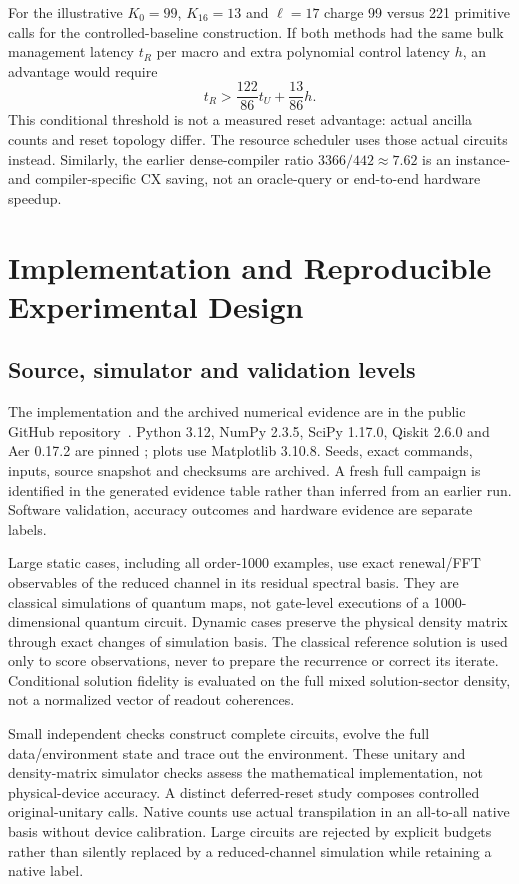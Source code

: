 \documentclass{ieeeaccess}
\begin{document}
For the illustrative $K_0=99$, $K_{16}=13$ and $\ell=17$ charge 99 versus 221 primitive calls for the controlled-baseline construction. If both methods had the same bulk management latency $t_R$ per macro and extra polynomial control latency $h$, an advantage would require
\begin{equation}\label{eq:break_even}
t_R>\frac{122}{86}t_U+\frac{13}{86}h.
\end{equation}
This conditional threshold is not a measured reset advantage: actual ancilla counts and reset topology differ. The resource scheduler uses those actual circuits instead. Similarly, the earlier dense-compiler ratio $3366/442\approx7.62$ is an instance- and compiler-specific CX saving, not an oracle-query or end-to-end hardware speedup.



\section{Implementation and Reproducible Experimental Design}
\subsection{Source, simulator and validation levels}
The implementation and the archived numerical evidence are in the public GitHub repository~\cite{r35}. Python 3.12, NumPy 2.3.5, SciPy 1.17.0, Qiskit 2.6.0 and Aer 0.17.2 are pinned \cite{r36}; plots use Matplotlib 3.10.8. Seeds, exact commands, inputs, source snapshot and checksums are archived. A fresh full campaign is identified in the generated evidence table rather than inferred from an earlier run. Software validation, accuracy outcomes and hardware evidence are separate labels.

Large static cases, including all order-1000 examples, use exact renewal/FFT observables of the reduced channel in its residual spectral basis. They are classical simulations of quantum maps, not gate-level executions of a 1000-dimensional quantum circuit. Dynamic cases preserve the physical density matrix through exact changes of simulation basis. The classical reference solution is used only to score observations, never to prepare the recurrence or correct its iterate. Conditional solution fidelity is evaluated on the full mixed solution-sector density, not a normalized vector of readout coherences.

Small independent checks construct complete circuits, evolve the full data/environment state and trace out the environment. These unitary and density-matrix simulator checks assess the mathematical implementation, not physical-device accuracy. A distinct deferred-reset study composes controlled original-unitary calls. Native counts use actual transpilation in an all-to-all native basis without device calibration. Large circuits are rejected by explicit budgets rather than silently replaced by a reduced-channel simulation while retaining a native label.
\end{document}
